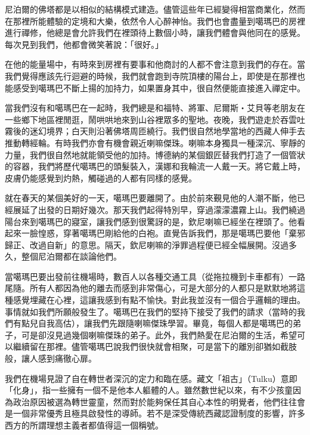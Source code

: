 尼泊爾的佛塔都是以相似的結構模式建造。儘管這些年已經變得相當商業化，然而在那裡所能體驗的定境和大樂，依然令人心醉神怡。我們也會盡量到噶瑪巴的房裡進行禪修，他總是會允許我們在裡頭待上數個小時，讓我們體會與他同在的感覺。每次見到我們，他都會微笑著說：「很好。」

在他的能量場中，有時來到房裡有要事和他商討的人都不會注意到我們的存在。當我們覺得應該先行迴避的時候，我們就會跑到寺院頂樓的陽台上，即使是在那裡也能感受到噶瑪巴不斷上揚的加持力，如果置身其中，很自然便能直接進入禪定中。

當我們沒有和噶瑪巴在一起時，我們總是和福特、將軍、尼爾斯‧艾貝等老朋友在一些鄉下地區裡閒逛，鬧哄哄地來到山谷裡眾多的聖地。夜晚，我們遊走於吞雲吐霧後的迷幻境界；白天則沿著佛塔周匝繞行。我們很自然地學當地的西藏人伸手去推動轉經輪。有時我們亦會有機會親近喇嘛傑珠。喇嘛本身獨具一種深沉、寧靜的力量，我們很自然地就能領受他的加持。博德納的某個銀匠替我們打造了一個管狀的容器，我們將歷代噶瑪巴的頭髮裝入，漢娜和我輪流一人戴一天。將它戴上時，皮膚仍能感覺到灼熱，觸碰過的人都有同樣的感覺。

就在春天的某個美好的一天，噶瑪巴要離開了。由於前來覲見他的人潮不斷，他已經展延了出發的日期好幾次。那天我們起得特別早，穿過濛濛濃霧上山。我們繞過陽台來到噶瑪巴的寢室，讓我們感到很驚訝的是，欽尼喇嘛已經坐在裡頭了。他看起來一臉惶惑，穿著噶瑪巴剛給他的白袍。直覺告訴我們，那是噶瑪巴要他「棄邪歸正、改過自新」的意思。隔天，欽尼喇嘛的淨罪過程便已經全幅展開。沒過多久，整個尼泊爾都在談論他們。

當噶瑪巴要出發前往機場時，數百人以各種交通工具（從拖拉機到卡車都有）一路尾隨。所有人都因為他的離去而感到非常傷心，可是大部分的人都只是默默地將這種感覺埋藏在心裡，這讓我感到有點不愉快。對此我並沒有一個合乎邏輯的理由。事情就如我們所願般發生了。噶瑪巴在我們的堅持下接受了我們的請求（當時的我們有點兒自我高估），讓我們先跟隨喇嘛傑珠學習。畢竟，每個人都是噶瑪巴的弟子，可是卻沒見過幾個喇嘛傑珠的弟子。此外，我們熱愛在尼泊爾的生活，希望可以繼續留在那裡。儘管噶瑪巴說我們很快就會相聚，可是當下的離別卻猶如截肢般，讓人感到痛徹心扉。

我們在機場見證了自在轉世者深沉的定力和臨在感。藏文「祖古」（Tulku）意即「化身」，指一些擁有一個不是他本人軀體的人。雖然數世紀以來，有不少孩童因為政治原因被選為轉世靈童，然而對於能夠保任其自心本性的明覺者，他們往往會是一個非常優秀且極具啟發性的導師。若不是深受傳統西藏認證制度的影響，許多西方的所謂理想主義者都值得這一個稱號。

